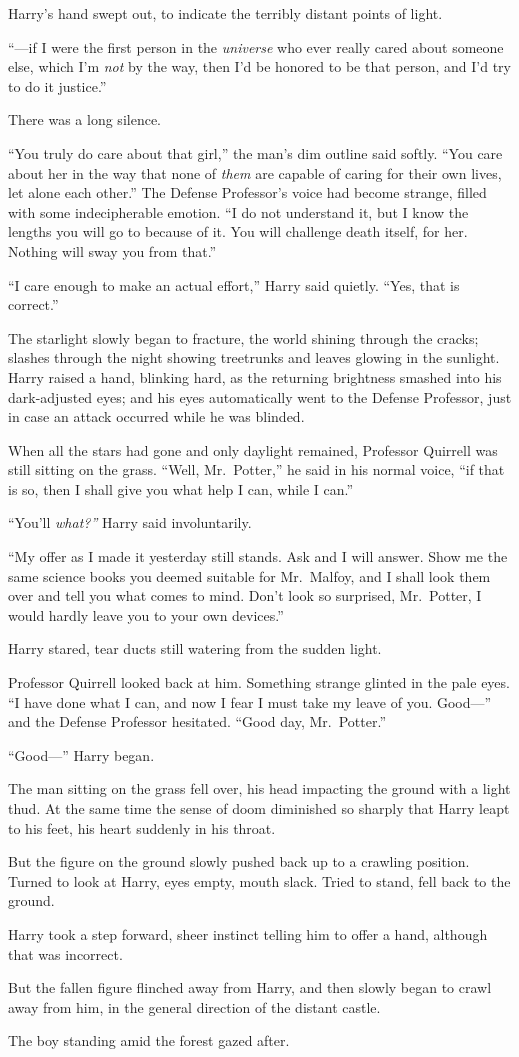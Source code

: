 Harry’s hand swept out, to indicate the terribly distant points of light.

“—if I were the first person in the \emph{universe} who ever really cared about someone else, which I’m \emph{not} by the way, then I’d be honored to be that person, and I’d try to do it justice.”

There was a long silence.

“You truly do care about that girl,” the man’s dim outline said softly. “You care about her in the way that none of \emph{them} are capable of caring for their own lives, let alone each other.” The Defense Professor’s voice had become strange, filled with some indecipherable emotion. “I do not understand it, but I know the lengths you will go to because of it. You will challenge death itself, for her. Nothing will sway you from that.”

“I care enough to make an actual effort,” Harry said quietly. “Yes, that is correct.”

The starlight slowly began to fracture, the world shining through the cracks; slashes through the night showing treetrunks and leaves glowing in the sunlight. Harry raised a hand, blinking hard, as the returning brightness smashed into his dark-adjusted eyes; and his eyes automatically went to the Defense Professor, just in case an attack occurred while he was blinded.

When all the stars had gone and only daylight remained, Professor Quirrell was still sitting on the grass. “Well, Mr.~Potter,” he said in his normal voice, “if that is so, then I shall give you what help I can, while I can.”

“You’ll \emph{what?”} Harry said involuntarily.

“My offer as I made it yesterday still stands. Ask and I will answer. Show me the same science books you deemed suitable for Mr.~Malfoy, and I shall look them over and tell you what comes to mind. Don’t look so surprised, Mr.~Potter, I would hardly leave you to your own devices.”

Harry stared, tear ducts still watering from the sudden light.

Professor Quirrell looked back at him. Something strange glinted in the pale eyes. “I have done what I can, and now I fear I must take my leave of you. Good—” and the Defense Professor hesitated. “Good day, Mr.~Potter.”

“Good—” Harry began.

The man sitting on the grass fell over, his head impacting the ground with a light thud. At the same time the sense of doom diminished so sharply that Harry leapt to his feet, his heart suddenly in his throat.

But the figure on the ground slowly pushed back up to a crawling position. Turned to look at Harry, eyes empty, mouth slack. Tried to stand, fell back to the ground.

Harry took a step forward, sheer instinct telling him to offer a hand, although that was incorrect.

But the fallen figure flinched away from Harry, and then slowly began to crawl away from him, in the general direction of the distant castle.

The boy standing amid the forest gazed after.
